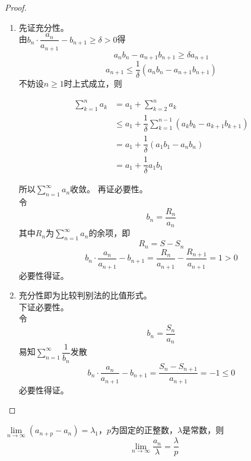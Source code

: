 \begin{proof}
    
    \begin{enumerate}

        \item   
            先证充分性。\\
            由$b_n \cdot \dfrac{a_n}{a_{n + 1}} - b_{n + 1} \geq \delta > 0$得
            $$a_nb_n - a_{n + 1}b_{n + 1} \geq \delta a_{n + 1}$$
            $$a_{n + 1} \leq \dfrac{1}{\delta}(a_nb_n - a_{n + 1}b_{n + 1})$$
            不妨设$n \geq 1$时上式成立，则

            \begin{align*}
                \sum\limits_{k  = 1}^{n}{a_k} & = a_1 + \sum\limits_{k = 2}^{n}{a_k} \\
                & \leq a_1 + \dfrac{1}{\delta} \sum\limits_{k  = 1}^{n - 1}{(a_k b_k - a_{k + 1}b_{k + 1})} \\
                & = a_1 + \dfrac{1}{\delta}(a_1 b_1 - a_{n}b_{n}) \\
                & = a_1 + \dfrac{1}{\delta}a_1 b_1
            \end{align*}

            所以$\sum\limits_{n = 1}^{\infty}{a_n}$收敛。
            再证必要性。\\
            令
            $$b_n = \dfrac{R_n}{a_n}$$
            其中$R_n$为$\sum\limits_{n = 1}^{\infty}{a_n}$的余项，即
            $$R_n = S - S_n$$
            $$b_n \cdot \dfrac{a_n}{a_{n + 1}} - b_{n + 1} = \dfrac{R_n}{a_{n + 1}} - \dfrac{R_{n + 1}}{a_{n + 1}} = 1 > 0$$
            必要性得证。

        \item   
            充分性即为比较判别法的比值形式。\\
            下证必要性。\\
            令
            $$b_n = \dfrac{S_n}{a_n}$$
            易知$\sum\limits_{n = 1}^{\infty}{\dfrac{1}{b_n}}$发散
            $$b_n \cdot \dfrac{a_n}{a_{n + 1}} - b_{n + 1} = \dfrac{S_{n} - S_{n + 1}}{a_{n + 1}} = -1 \leq 0$$
            必要性得证。

\end{enumerate}

\end{proof}

\begin{proposition}
    
    $\lim\limits_{n \to \infty}{(a_{n + p} - a_n)} = \lambda_1$，$p$为固定的正整数，$\lambda$是常数，则
    $$\lim\limits_{n \to \infty}{\dfrac{a_n}{\lambda}} = \dfrac{\lambda}{p}$$

\end{proposition}

